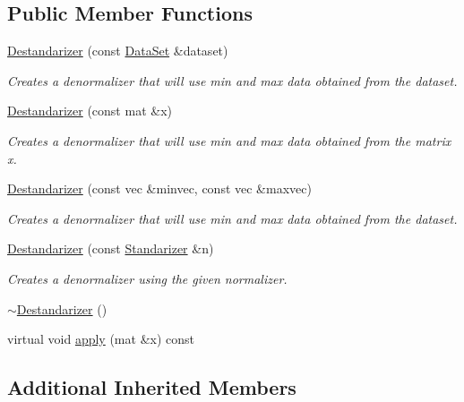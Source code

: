 \subsection*{Public Member Functions}
\begin{DoxyCompactItemize}
\item 
\hyperlink{classhappyml_1_1Destandarizer_abc64ade944fc341a889ef3b703e294dc}{Destandarizer} (const \hyperlink{classhappyml_1_1DataSet}{Data\+Set} \&dataset)
\begin{DoxyCompactList}\small\item\em Creates a denormalizer that will use min and max data obtained from the dataset. \end{DoxyCompactList}\item 
\hyperlink{classhappyml_1_1Destandarizer_ae8ede809ec02a8a8553fbf0b13d0dc67}{Destandarizer} (const mat \&x)
\begin{DoxyCompactList}\small\item\em Creates a denormalizer that will use min and max data obtained from the matrix x. \end{DoxyCompactList}\item 
\hyperlink{classhappyml_1_1Destandarizer_a248bde27fb7e9befc813a1db7daba7bb}{Destandarizer} (const vec \&minvec, const vec \&maxvec)
\begin{DoxyCompactList}\small\item\em Creates a denormalizer that will use min and max data obtained from the dataset. \end{DoxyCompactList}\item 
\hyperlink{classhappyml_1_1Destandarizer_ad892a74ae3ca529548305cda54969c6e}{Destandarizer} (const \hyperlink{classhappyml_1_1Standarizer}{Standarizer} \&n)
\begin{DoxyCompactList}\small\item\em Creates a denormalizer using the given normalizer. \end{DoxyCompactList}\item 
\hyperlink{classhappyml_1_1Destandarizer_a8e20a4a4d1245217ea0b8eba7b740a6e}{$\sim$\+Destandarizer} ()
\item 
virtual void \hyperlink{classhappyml_1_1Destandarizer_a2d1542f1857bfe0cb23fa69b139d2368}{apply} (mat \&x) const 
\end{DoxyCompactItemize}
\subsection*{Additional Inherited Members}


